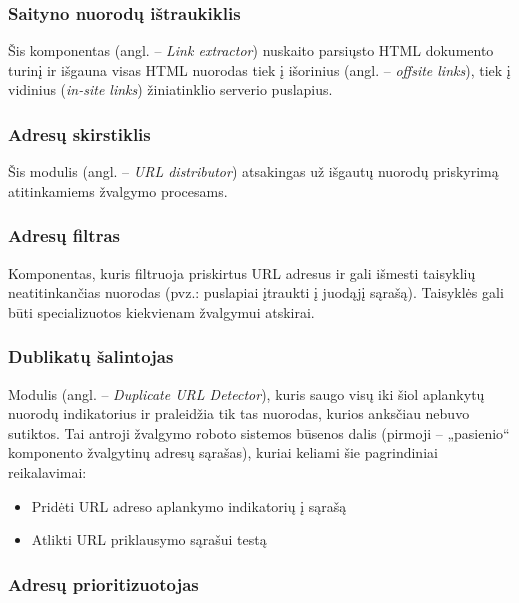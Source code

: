 \subsubsection{Saityno nuorodų ištraukiklis}

Šis komponentas (angl. -- \textit{Link extractor}) nuskaito parsiųsto HTML dokumento turinį ir išgauna visas HTML nuorodas tiek į išorinius (angl. -- \textit{offsite links}), tiek į vidinius (\textit{in-site links}) žiniatinklio serverio puslapius.

\subsubsection{Adresų skirstiklis}

Šis modulis (angl. -- \textit{URL distributor}) atsakingas už išgautų nuorodų priskyrimą atitinkamiems žvalgymo procesams.

\subsubsection{Adresų filtras}

Komponentas, kuris filtruoja priskirtus URL adresus ir gali išmesti taisyklių neatitinkančias nuorodas (pvz.: puslapiai įtraukti į juodąjį sąrašą). Taisyklės gali būti specializuotos kiekvienam žvalgymui atskirai.

\subsubsection{Dublikatų šalintojas}

Modulis (angl. -- \textit{Duplicate URL Detector}), kuris saugo visų iki šiol aplankytų nuorodų indikatorius ir praleidžia tik tas nuorodas, kurios anksčiau nebuvo sutiktos. Tai antroji žvalgymo roboto sistemos būsenos dalis (pirmoji -- „pasienio“ komponento žvalgytinų adresų sąrašas), kuriai keliami šie pagrindiniai reikalavimai:

\begin{itemize}
    \item Pridėti URL adreso aplankymo indikatorių į sąrašą
    \item Atlikti URL priklausymo sąrašui testą
\end{itemize}

\subsubsection{Adresų prioritizuotojas}

